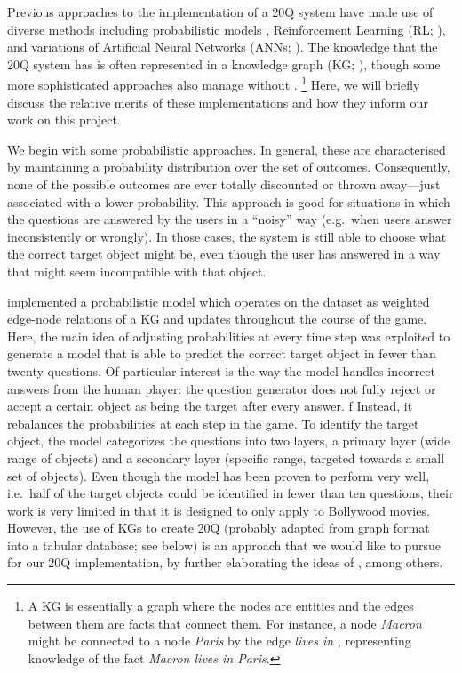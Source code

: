 \documentclass[11pt,a4paper]{article}
\begin{document}
Previous approaches to the implementation of a 20Q system have made use of diverse methods including probabilistic models \citep{DeyEa2019}, Reinforcement Learning (RL; \citealt{HuEa2018}), and variations of Artificial Neural Networks (ANNs; \citealt{ReddyEa2017, Burgener2006, ToninEa2018}).
The knowledge that the 20Q system has is often represented in a knowledge graph (KG; \citealt{DeyEa2019}), though some more sophisticated approaches also manage without \citep[e.g.][]{HuEa2018}.%
\footnote{A KG is essentially a graph where the nodes are entities and the edges between them are facts that connect them.
	For instance, a node \textit{Macron} might be connected to a node \textit{Paris} by the edge \textit{lives in} \citep[example from][]{GodinEa2019}, representing knowledge of the fact \textit{Macron lives in Paris}.}
Here, we will briefly discuss the relative merits of these implementations and how they inform our work on this project.

We begin with some probabilistic approaches.
In general, these are characterised by maintaining a probability distribution over the set of outcomes.
Consequently, none of the possible outcomes are ever totally discounted or thrown away---just associated with a lower probability.
This approach is good for situations in which the questions are answered by the users in a ``noisy'' way (e.g.\ when users answer inconsistently or wrongly).
In those cases, the system is still able to choose what the correct target object might be, even though the user has answered in a way that might seem incompatible with that object.

\citet{DeyEa2019} implemented a probabilistic model which operates on the dataset as weighted edge-node relations of a KG and updates throughout the course of the game. 
Here, the main idea of adjusting probabilities at every time step was exploited to generate a model that is able to predict the correct target object in fewer than twenty questions. 
Of particular interest is the way the model handles incorrect answers from the human player: the question generator does not fully reject or accept a certain object as being the target after every answer. f
Instead, it rebalances the probabilities at each step in the game. 
To identify the target object, the model categorizes the questions into two layers, a primary layer (wide range of objects) and a secondary layer (specific range, targeted towards a small set of objects). 
Even though the model has been proven to perform very well, i.e.\ half of the target objects could be identified in fewer than ten questions, their work is very limited in that it is designed to only apply to Bollywood movies. 
However, the use of KGs to create 20Q (probably adapted from graph format into a tabular database; see below) is an approach that we would like to pursue for our 20Q implementation, by further elaborating the ideas of \citet{DeyEa2019}, among others.
\end{document}

